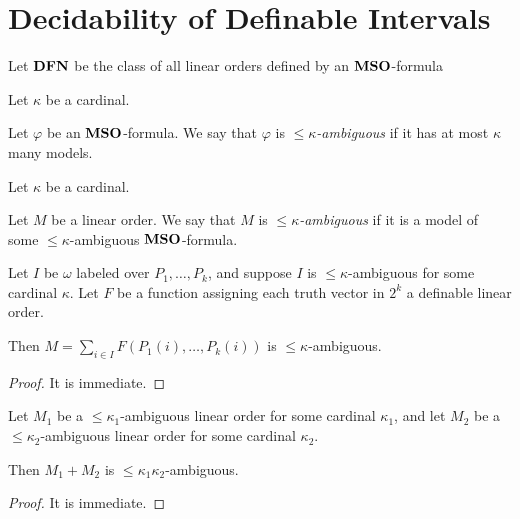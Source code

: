 \section{Decidability of Definable Intervals}

\begin{definition}
    Let $\mathbf{DFN}$ be the class of all linear orders defined
    by an $\mathbf{MSO}$-formula
\end{definition}

\begin{definition}
    Let $\kappa$ be a cardinal.

    Let $\varphi$ be an $\mathbf{MSO}$-formula.
    We say that $\varphi$ is \emph{$\le \kappa$-ambiguous}
    if it has at most $\kappa$ many models.
\end{definition}

\begin{definition}
    Let $\kappa$ be a cardinal.

    Let $M$ be a linear order.
    We say that $M$ is \emph{$\le \kappa$-ambiguous}
    if it is a model of some $\le \kappa$-ambiguous $\mathbf{MSO}$-formula.
\end{definition}

\begin{lemma}
    Let $I$ be $\omega$ labeled over $P_1, \ldots, P_k$, and suppose $I$ is $\le \kappa$-ambiguous for some cardinal $\kappa$.
    Let $F$ be a function assigning each truth vector in $2^k$ a definable linear order.

    Then $M = \sum_{i \in I} F(P_1(i), \ldots, P_k(i))$ is $\le \kappa$-ambiguous.
\end{lemma}

\begin{proof}
    It is immediate.
\end{proof}

\begin{lemma}
    Let $M_1$ be a $\le \kappa_1$-ambiguous linear order for some cardinal $\kappa_1$,
    and let $M_2$ be a $\le \kappa_2$-ambiguous linear order for some cardinal $\kappa_2$.

    Then $M_1 + M_2$ is $\le \kappa_1 \kappa_2$-ambiguous.
\end{lemma}

\begin{proof}
    It is immediate.
\end{proof}

